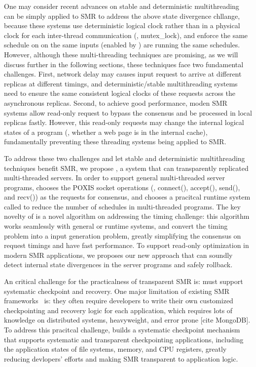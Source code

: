 One may consider recent
advances on stable and deterministic multithreading 
~\cite{dmp:asplos09, coredet:asplos10, dos:osdi10, kendo:asplos09, 
determinator:osdi10, cui:tern:osdi10, dthreads:sosp11, peregrine:sosp11, parrot:sosp13}
can be simply applied to SMR to address the above state divergence chllange,
because these systems use deterministic logical clock rather than in 
 a physical clock for each inter-thread communication (\eg, mutex\_lock), 
 and enforce the same schedule on on the same inputs (enabled by 
\smt) are running the same schedules.
However, although these multi-threading techniques are promising,
as we will discuss further in the following sections, 
these techniques face two fundamental challenges. First, network delay may 
causes input request to arrive at different replicas at different timings,
and deterministic/stable multithreading systems need to 
ensure the same consistent logical clocks of these requests across the asynchronous replicas. Second, 
to achieve good performance, moden SMR systems allow read-only request to 
bypass the consensus and be processed in local replicas fastly. However, this read-only 
requests may change the internal logical states of a program (\eg, whether a 
web page is in the \apache internal cache), 
fundamentally preventing these threading systems being applied to SMR.

To address these two challenges and let stable and deterministic 
multithreading techniques benefit SMR, we propose \msmr, a system that can 
transparently replicated multi-threaded servers.
In order to support general multi-threaded server programs, \msmr chooses the 
POXIS socket operations (\eg, connect(), accept(), send(), and recv()) as the 
requests for consensus, and chooses a pracitcal \smt runtime system called 
\parrot to reduce the number of schedules in multi-threaded programs. The key 
novelty of \msmr is a novel algorithm on addressing the timing 
challenge: this algorithm works seamlessly with general \smt or \dmt runtime systems, 
and convert the timing problem into a input generation problem, greatly simplifying the consensus on 
request timings and have fast performance. To support read-only optimization 
in modern SMR applications, we proposes our new approach that can soundly 
detect internal state divergences in the server programs and safely rollback.

An critical challenge for the practicalness of transparent SMR is: \msmr must 
support systematic checkpoint and recovery. One major limitation of existing SMR 
frameworks~\cite{rex:eurosys14} is: they often require developers to write their own 
customized checkpointing and recovery logic for each application, which 
requires lots of knowledge on distributed systems, heavyweight, and error prone [cite MongoDB].
To address this pracitcal challenge, \msmr builds a 
systematic checkpoint mechanism that supports systematic and transparent 
checkpointing applications, including the application states of file systems, memory, and CPU 
registers, greatly reducing devlopers' efforts and making SMR transparent to 
application logic.

